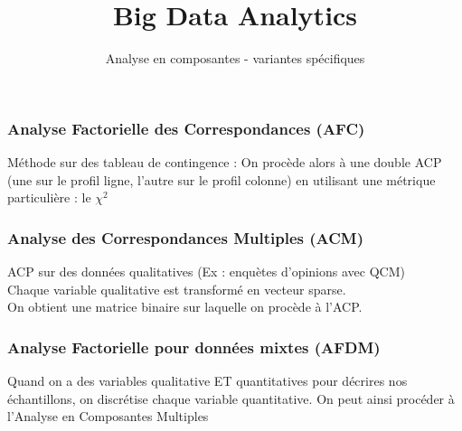 \documentclass{formation}
\title{Big Data Analytics}
\subtitle{Analyse en composantes - variantes spécifiques}
\begin{document}
\maketitle

\begin{frame}
  \frametitle{Analyse Factorielle des Correspondances (AFC)}
  Méthode sur des tableau de contingence :
  On procède alors à une double ACP (une sur le profil ligne, l'autre sur le profil colonne) en utilisant une métrique particulière : le $\chi^2$
\end{frame}

\begin{frame}
  \frametitle{Analyse des Correspondances Multiples (ACM)}
  ACP sur des données qualitatives (Ex : enquètes d'opinions avec QCM) \\
  Chaque variable qualitative est transformé en vecteur sparse. \\
  On obtient une matrice binaire sur laquelle on procède à l'ACP.\\
\end{frame}

\begin{frame}
  \frametitle{Analyse Factorielle pour données mixtes (AFDM)}
  Quand on a des variables qualitative ET quantitatives pour décrires nos échantillons, on discrétise chaque variable quantitative. On peut ainsi procéder à l'Analyse en Composantes Multiples
\end{frame}
\end{document}

